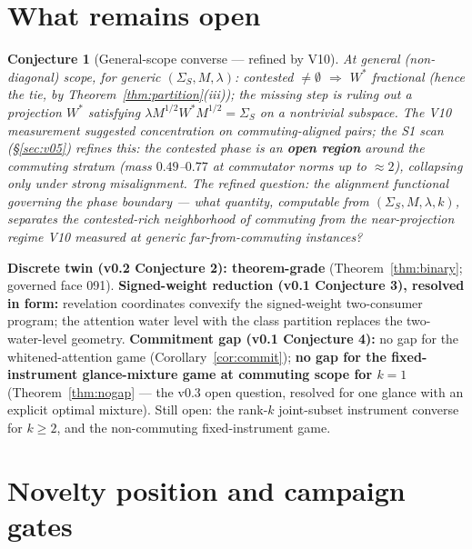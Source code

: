 \documentclass[11pt]{article}
\newtheorem{conjecture}{Conjecture}
\theoremstyle{definition}
\begin{document}
\section{What remains open}

\begin{conjecture}[General-scope converse --- refined by V10]
\label{conj:converse}
At general (non-diagonal) scope, for generic $(\Sigma_S, M,
\lambda)$: contested $\neq\emptyset$ $\Rightarrow$ $W^\ast$
fractional (hence the tie, by Theorem~\ref{thm:partition}(iii)); the
missing step is ruling out a \emph{projection} $W^\ast$ satisfying
$\lambda M^{1/2}W^\ast M^{1/2} = \Sigma_S$ on a nontrivial subspace.
The V10 measurement suggested concentration on commuting-aligned
pairs; the S1 scan (\S\ref{sec:v05}) \emph{refines} this: the
contested phase is an \textbf{open region} around the commuting
stratum (mass $0.49$--$0.77$ at commutator norms up to $\approx2$),
collapsing only under strong misalignment. The refined question: the
alignment functional governing the phase boundary --- what quantity,
computable from $(\Sigma_S, M, \lambda, k)$, separates the
contested-rich neighborhood of commuting from the near-projection
regime V10 measured at generic far-from-commuting instances?
\end{conjecture}

\textbf{Discrete twin (v0.2 Conjecture 2): theorem-grade}
(Theorem~\ref{thm:binary}; governed face 091). \textbf{Signed-weight
reduction (v0.1 Conjecture 3), resolved in form:} revelation
coordinates convexify the signed-weight two-consumer program; the
attention water level with the class partition replaces the
two-water-level geometry. \textbf{Commitment gap (v0.1 Conjecture
4):} no gap for the whitened-attention game
(Corollary~\ref{cor:commit}); \textbf{no gap for the
fixed-instrument glance-mixture game at commuting scope for $k=1$}
(Theorem~\ref{thm:nogap} --- the v0.3 open question, resolved for one
glance with an explicit optimal mixture). Still open: the rank-$k$
joint-subset instrument converse for $k\ge2$, and the non-commuting
fixed-instrument game.

\section{Novelty position and campaign gates}
\end{document}
